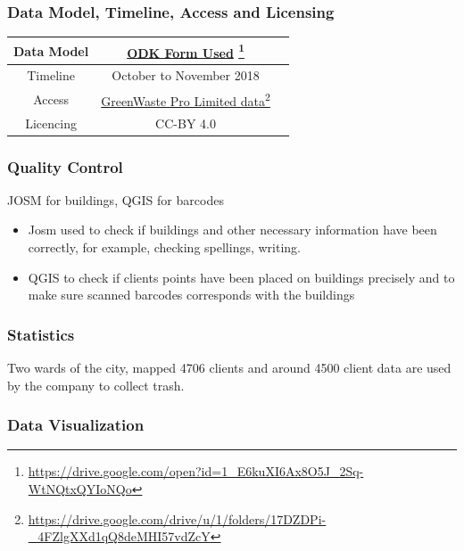 \documentclass[a4paper,12pt,twoside]{article}
\begin{document}
\medskip
\subsubsection{Data Model, Timeline, Access and Licensing}
\begin{center}
\begin{tabular}{|c|c|c|}  
 \hline
Data Model &
       \href{https://drive.google.com/open?id=1_E6kuXI6Ax8O5J_2Sq-WtNQtxQYIoNQo}{ODK Form Used} \footnote{\url{https://drive.google.com/open?id=1_E6kuXI6Ax8O5J_2Sq-WtNQtxQYIoNQo}} \\
 \hline
  Timeline  &  October to November 2018 \\
\hline  
 Access  & 
    \href{https://drive.google.com/drive/u/1/folders/17DZDPi-_4FZlgXXd1qQ8deMHI57vdZcY}{GreenWaste Pro Limited data}\footnote{\url{https://drive.google.com/drive/u/1/folders/17DZDPi-_4FZlgXXd1qQ8deMHI57vdZcY}} \\
   
\hline 
    Licencing & CC-BY 4.0 \\
\hline
\end{tabular}
\end{center}
\subsubsection{Quality Control}

JOSM for buildings, QGIS for barcodes
\begin{itemize}
    \item Josm used to check if buildings and other necessary information have been correctly, for example, checking spellings, writing. 
     \item QGIS to check if clients points have been placed on buildings precisely and to make sure scanned barcodes corresponds with the buildings 
\end{itemize}

\subsubsection{Statistics}
Two wards of the city, mapped 4706 clients and around 4500 client data are used by the company to collect trash.

\newpage
\subsubsection{Data Visualization}
\end{document}
